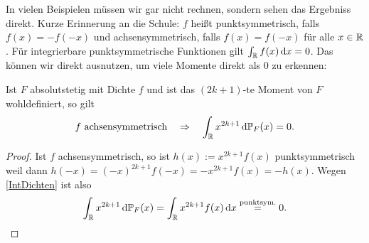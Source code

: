 In vielen Beispielen m\"ussen wir gar nicht rechnen, sondern sehen das Ergebniss direkt. Kurze Erinnerung an die Schule: $f$ hei\ss t punktsymmetrisch, falls $f(x)=-f(-x)$ und achsensymmetrisch, falls $f(x)=f(-x)$ f\"ur alle $x\in \mathbb{R}$. F\"ur integrierbare punktsymmetrische Funktionen gilt $\int_{\mathbb{R}} f(x)\, \mathrm{d} x=0$. Das k\"onnen wir direkt ausnutzen, um viele Momente direkt als $0$ zu erkennen:
\begin{lemma}\label{ky}
	Ist $F$ absolutstetig mit Dichte $f$ und ist das $(2k+1)$-te Moment von $F$ wohldefiniert, so gilt
	\[ f \text{ achsensymmetrisch} \quad \Rightarrow \quad \int_{\mathbb{R}} x^{2k+1}\, \mathrm{d} \mathbb P_F(x)= 0. \]
\end{lemma}
\begin{proof}
	Ist $f$ achsensymmetrisch, so ist $h(x) := x^{2k+1}f(x)$ punktsymmetrisch weil dann $h(-x) = (-x)^{2k+1}f(-x) = -x^{2k+1}f(x) = -h(x)$. Wegen \ref{IntDichten} ist also \[ \int_{\mathbb{R}} x^{2k+1} \, \mathrm{d} \mathbb{P}_F(x) = \int_{\mathbb{R}} x^{2k+1} f(x) \, \mathrm{d} x \overset{\text{punktsym.}}{=} 0. \]	
\end{proof}

